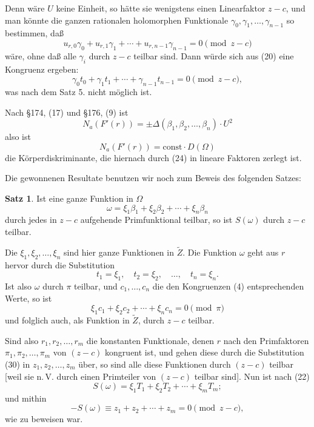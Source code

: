 \documentclass[12pt,a4paper]{article}
\theoremstyle{definition}
\newtheorem{satz}{Satz}[section]
\begin{document}
Denn wäre $U$ keine Einheit, so hätte sie wenigstens einen Linearfaktor $z - c$, und man könnte die ganzen rationalen holomorphen Funktionale $\gamma_0, \gamma_1, \ldots, \gamma_{n-1}$ so bestimmen, daß
\[u_{r,0}\gamma_0 + u_{r,1}\gamma_1 + \cdots + u_{r,n-1}\gamma_{n-1} = 0 \pmod{z-c}\]
wäre, ohne daß alle $\gamma_i$ durch $z - c$ teilbar sind. Dann würde sich aus (20) eine Kongruenz ergeben:
\[\gamma_0t_0 + \gamma_1t_1 + \cdots + \gamma_{n-1}t_{n-1} = 0 \pmod{z-c},\]
was nach dem Satz 5. nicht möglich ist.

Nach \S 174, (17) und \S 176, (9) ist
\begin{equation}
N_a(F'(r)) = \pm \Delta(\beta_1, \beta_2, \ldots, \beta_n) \cdot U^2
\end{equation}
also ist
\begin{equation}
N_a(F'(r)) = \text{const} \cdot D(\Omega)
\end{equation}
die Körperdiskriminante, die hiernach durch (24) in lineare Faktoren zerlegt ist.

Die gewonnenen Resultate benutzen wir noch zum Beweis des folgenden Satzes:

\begin{satz}
Ist eine ganze Funktion in $\Omega$
\begin{equation}
\omega = \xi_1\beta_1 + \xi_2\beta_2 + \cdots + \xi_n\beta_n
\end{equation}
durch jedes in $z - c$ aufgehende Primfunktional teilbar, so ist $S(\omega)$ durch $z - c$ teilbar.
\end{satz}

Die $\xi_1, \xi_2, \ldots, \xi_n$ sind hier ganze Funktionen in $\tilde{Z}$. Die Funktion $\omega$ geht aus $r$ hervor durch die Substitution
\begin{equation}
t_1 = \xi_1, \quad t_2 = \xi_2, \quad \ldots, \quad t_n = \xi_n.
\end{equation}
Ist also $\omega$ durch $\pi$ teilbar, und $c_1, \ldots, c_n$ die den Kongruenzen (4) entsprechenden Werte, so ist
\[\xi_1c_1 + \xi_2c_2 + \cdots + \xi_nc_n = 0 \pmod{\pi}\]
und folglich auch, als Funktion in $\tilde{Z}$, durch $z - c$ teilbar.

Sind also $r_1, r_2, \ldots, r_m$ die konstanten Funktionale, denen $r$ nach den Primfaktoren $\pi_1, \pi_2, \ldots, \pi_m$ von $(z - c)$ kongruent ist, und gehen diese durch die Substitution (30) in $z_1, z_2, \ldots, z_m$ über, so sind alle diese Funktionen durch $(z - c)$ teilbar [weil sie n.\,V. durch einen Primteiler von $(z - c)$ teilbar sind]. Nun ist nach (22)
\begin{equation}
S(\omega) = \xi_1T_1 + \xi_2T_2 + \cdots + \xi_mT_m;
\end{equation}
und mithin
\[-S(\omega) \equiv z_1 + z_2 + \cdots + z_m = 0 \pmod{z-c},\]
wie zu beweisen war.
\end{document}
